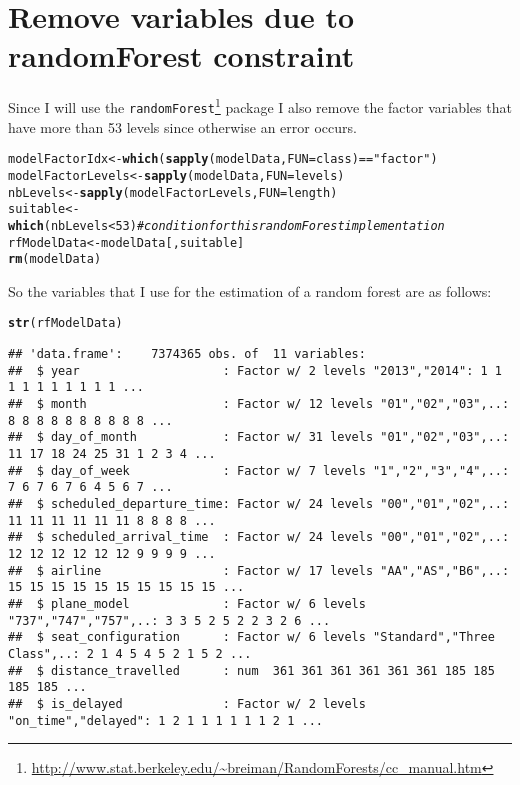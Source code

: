 \documentclass{article}\usepackage[]{graphicx}\usepackage[]{color}
\makeatletter
\newcommand{\hlnum}[1]{\textcolor[rgb]{0.686,0.059,0.569}{#1}}%
\newcommand{\hlstr}[1]{\textcolor[rgb]{0.192,0.494,0.8}{#1}}%
\newcommand{\hlcom}[1]{\textcolor[rgb]{0.678,0.584,0.686}{\textit{#1}}}%
\newcommand{\hlopt}[1]{\textcolor[rgb]{0,0,0}{#1}}%
\newcommand{\hlstd}[1]{\textcolor[rgb]{0.345,0.345,0.345}{#1}}%
\newcommand{\hlkwb}[1]{\textcolor[rgb]{0.69,0.353,0.396}{#1}}%
\newcommand{\hlkwc}[1]{\textcolor[rgb]{0.333,0.667,0.333}{#1}}%
\newcommand{\hlkwd}[1]{\textcolor[rgb]{0.737,0.353,0.396}{\textbf{#1}}}%
\newenvironment{kframe}{%
 \def\at@end@of@kframe{}%
 \ifinner\ifhmode%
  \def\at@end@of@kframe{\end{minipage}}%
  \begin{minipage}{\columnwidth}%
 \fi\fi%
 \def\FrameCommand##1{\hskip\@totalleftmargin \hskip-\fboxsep
 \colorbox{shadecolor}{##1}\hskip-\fboxsep
     \hskip-\linewidth \hskip-\@totalleftmargin \hskip\columnwidth}%
 \MakeFramed {\advance\hsize-\width
   \@totalleftmargin\z@ \linewidth\hsize
   \@setminipage}}%
 {\par\unskip\endMakeFramed%
 \at@end@of@kframe}
\newenvironment{knitrout}{}{} %
\makeatother
\begin{document}
\section{Remove variables due to randomForest constraint}

Since I will use the \verb+randomForest+\footnote{\url{http://www.stat.berkeley.edu/~breiman/RandomForests/cc_manual.htm}} package I also remove the factor variables that have more than 53 levels since otherwise an error occurs.
\begin{knitrout}
\color{fgcolor}\begin{kframe}
\begin{alltt}
\hlstd{modelFactorIdx} \hlkwb{<-} \hlkwd{which}\hlstd{(}\hlkwd{sapply}\hlstd{(modelData,} \hlkwc{FUN}\hlstd{=class)} \hlopt{==} \hlstr{"factor"}\hlstd{)}
\hlstd{modelFactorLevels} \hlkwb{<-} \hlkwd{sapply}\hlstd{(modelData,} \hlkwc{FUN}\hlstd{=levels)}
\hlstd{nbLevels} \hlkwb{<-} \hlkwd{sapply}\hlstd{(modelFactorLevels,} \hlkwc{FUN}\hlstd{=length)}
\hlstd{suitable} \hlkwb{<-} \hlkwd{which}\hlstd{(nbLevels} \hlopt{<} \hlnum{53}\hlstd{)} \hlcom{# condition for this randomForest implementation}
\hlstd{rfModelData} \hlkwb{<-} \hlstd{modelData[,suitable]}
\hlkwd{rm}\hlstd{(modelData)}
\end{alltt}
\end{kframe}
\end{knitrout}

So the variables that I use for the estimation of a random forest are as follows:
\begin{knitrout}
\color{fgcolor}\begin{kframe}
\begin{alltt}
\hlkwd{str}\hlstd{(rfModelData)}
\end{alltt}
\begin{verbatim}
## 'data.frame':	7374365 obs. of  11 variables:
##  $ year                    : Factor w/ 2 levels "2013","2014": 1 1 1 1 1 1 1 1 1 1 ...
##  $ month                   : Factor w/ 12 levels "01","02","03",..: 8 8 8 8 8 8 8 8 8 8 ...
##  $ day_of_month            : Factor w/ 31 levels "01","02","03",..: 11 17 18 24 25 31 1 2 3 4 ...
##  $ day_of_week             : Factor w/ 7 levels "1","2","3","4",..: 7 6 7 6 7 6 4 5 6 7 ...
##  $ scheduled_departure_time: Factor w/ 24 levels "00","01","02",..: 11 11 11 11 11 11 8 8 8 8 ...
##  $ scheduled_arrival_time  : Factor w/ 24 levels "00","01","02",..: 12 12 12 12 12 12 9 9 9 9 ...
##  $ airline                 : Factor w/ 17 levels "AA","AS","B6",..: 15 15 15 15 15 15 15 15 15 15 ...
##  $ plane_model             : Factor w/ 6 levels "737","747","757",..: 3 3 5 2 5 2 2 3 2 6 ...
##  $ seat_configuration      : Factor w/ 6 levels "Standard","Three Class",..: 2 1 4 5 4 5 2 1 5 2 ...
##  $ distance_travelled      : num  361 361 361 361 361 361 185 185 185 185 ...
##  $ is_delayed              : Factor w/ 2 levels "on_time","delayed": 1 2 1 1 1 1 1 1 2 1 ...
\end{verbatim}
\end{kframe}
\end{knitrout}
\end{document}
